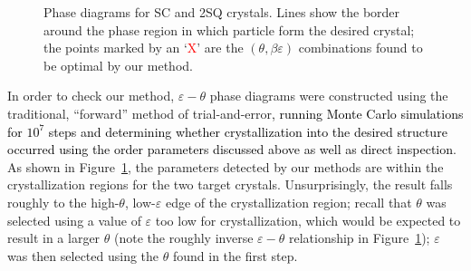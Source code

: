 \begin{figure}
	\begin{center}

	\end{center}
	\caption[Phase diagrams for simple cubic and 2D square crystals]{Phase diagrams for  SC and  2SQ crystals.  Lines show the border around the phase region in which particle form the desired crystal; the points marked by an `\textcolor{red}{X}' are the $(\theta, \beta\varepsilon)$ combinations found to be optimal by our method.}\label{phase}
\end{figure}

In order to check our method, $\varepsilon-\theta$ phase diagrams were constructed using the traditional, ``forward'' method of trial-and-error\textcolor{black}{, running Monte Carlo simulations for $10^7$ steps and determining whether crystallization into the desired structure occurred using the order parameters discussed above as well as direct inspection}.
As shown in Figure~\ref{phase}, the parameters detected by our methods are within the crystallization regions for the two target crystals.
Unsurprisingly, the result falls roughly to the high-$\theta$, low-$\varepsilon$ edge of the crystallization region; recall that $\theta$ was selected using a value of $\varepsilon$ too low for crystallization, which would be expected to result in a larger $\theta$ (note the roughly inverse $\varepsilon-\theta$ relationship in Figure~\ref{phase}); $\varepsilon$ was then selected using the $\theta$ found in the first step.

